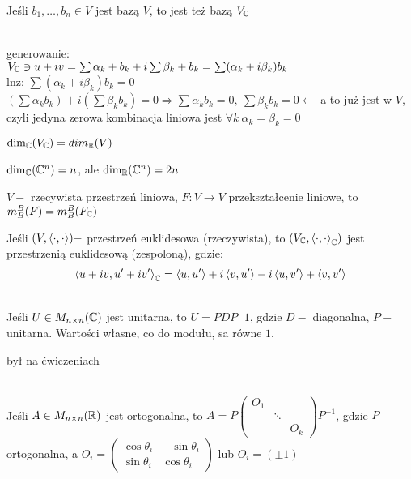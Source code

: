 \begin{ft} 
    Jeśli $b_1,\ldots,b_n \in V$ jest bazą $V$, to jest też bazą $V_{\mathbb{C}}$
\end{ft} 
\begin{dd} ~\\ 
    generowanie: \\ 
    $V_{\mathbb{C}} \ni u + iv = \sum \alpha_k + b_k + i\sum \beta_k + b_k = \sum (\alpha_k + 
    i \beta_k ) b_k$ \\ 
    lnz: $\sum (\alpha_k + i \beta_k) b_k = 0$ \\ 
    $ (\sum \alpha_k b_k) + i(\sum \beta_k b_k) = 0 \Rightarrow 
    \sum\alpha_k b_k = 0,\ \sum\beta_k b_k =0 \leftarrow$ a to już jest w $V$, czyli jedyna
    zerowa kombinacja liniowa jest $\forall k \ \alpha_k = \beta_k = 0 $
\end{dd} 
\begin{wn} $\dim_{\mathbb{C}} (V_{\mathbb{C}}) = dim_{\mathbb{R}} (V)$ \end{wn} 
\begin{uw} $\dim_{\mathbb{C}} (\mathbb{C}^n) = n$, ale $\dim_{\mathbb{R}} (\mathbb{C}^n) = 2n$ \end{uw} 
\begin{wn} $V - $ rzecywista przestrzeń liniowa, $F: V \to V$ przekształcenie liniowe, to 
    $m_B^B (F) = m_B^B (F_{\mathbb{C}})$ \end{wn}
    \begin{df}[Fakt]
    Jeśli $(V,\left\langle \cdot, \cdot \right\rangle) - $ przestrzeń euklidesowa (rzeczywista), to 
    $(V_{\mathbb{C}}, \left\langle \cdot, \cdot \right\rangle _{\mathbb{C}})$ jest przestrzenią euklidesową (zespoloną), gdzie:
    \[ \left\langle u+iv, u'+iv' \right\rangle_{\mathbb{C}} = \left\langle u, u' \right\rangle + i\left\langle v, u' \right\rangle - i\left\langle u, v' \right\rangle + \left\langle v, v' \right\rangle\]
\end{df} 
\begin{tw} ~\\
    Jeśli $U \in M_{n \times n} (\mathbb{C})$ jest unitarna, to $U = PDP^-1$, gdzie 
    $D - $ diagonalna, $P - $ unitarna. Wartości własne, co do modułu, sa równe $1$.
\end{tw} 
\begin{dd} był na ćwiczeniach \end{dd} 
\begin{tw} ~\\ 
    Jeśli $A \in M_{n \times n}(\mathbb{R})$ jest ortogonalna, to 
    $A = P \begin{pmatrix} O_1 & & \\ & \ddots & \\ & & O_k \end{pmatrix} P^{-1}$, gdzie 
    $P$ - ortogonalna, a $O_i = \begin{pmatrix} \cos \theta_i & -\sin\theta_i
    \\ \sin \theta_i & \cos \theta_i \end{pmatrix}$ lub $O_i = (\pm 1)$
\end{tw} 
